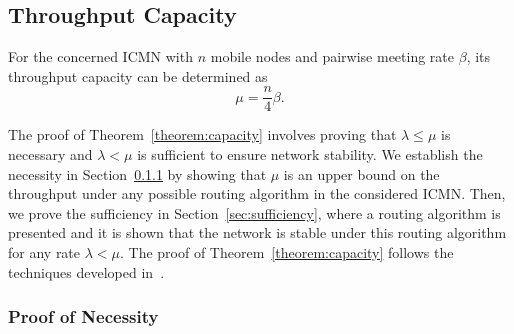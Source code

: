 \documentclass[twocolumn, 10pt]{svjour3}         \smartqed  \usepackage{graphicx}
\begin{document}
\subsection{Throughput Capacity}
\begin{theorem}\label{theorem:capacity}
For the concerned ICMN with $n$ mobile nodes and pairwise meeting rate $\beta$, its throughput capacity can be determined as 
\begin{equation}\label{eqn:capacity}
	\mu = \frac{n}{4} \beta.
\end{equation}
\end{theorem}


The proof of  Theorem~\ref{theorem:capacity} involves  proving that  $\lambda \leq \mu$ is necessary and $\lambda < \mu$ is sufficient to  ensure network stability.
We establish the necessity in Section~\ref{sec:necessity} by showing that $\mu$ is an upper bound on the  throughput under any possible routing algorithm in the considered ICMN.
Then, we prove the sufficiency in Section~\ref{sec:sufficiency}, where  a routing algorithm is presented and it is shown that the network is stable under this routing algorithm for any  rate $\lambda < \mu$.
The proof of Theorem~\ref{theorem:capacity} follows the techniques developed in~\cite{Neely2005}.







\subsubsection{Proof of Necessity}\label{sec:necessity}
\end{document}
